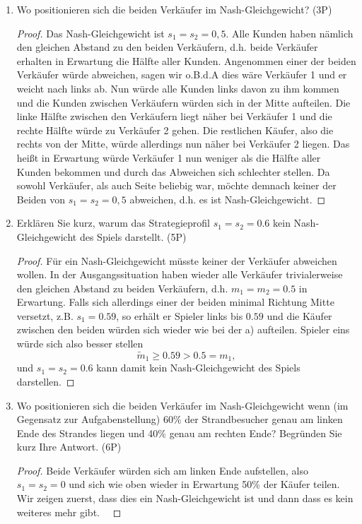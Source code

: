 \documentclass[12pt]{article}
\begin{document}
\begin{enumerate}[label=\alph*\upshape)]
	\item Wo positionieren sich die beiden Verkäufer im Nash-Gleichgewicht? (3P)
		\begin{proof}
			Das Nash-Gleichgewicht ist $s_1 = s_2 = 0,5$. Alle Kunden haben nämlich den gleichen Abstand zu den beiden Verkäufern, d.h. beide Verkäufer erhalten in Erwartung die Hälfte aller Kunden. Angenommen einer der beiden Verkäufer würde abweichen, sagen wir o.B.d.A dies wäre Verkäufer 1 und er weicht nach links ab. Nun würde alle Kunden links davon zu ihm kommen und die Kunden zwischen Verkäufern würden sich in der Mitte aufteilen. Die linke Hälfte zwischen den Verkäufern liegt näher bei Verkäufer 1 und die rechte Hälfte würde zu Verkäufer 2 gehen. Die restlichen Käufer, also die rechts von der Mitte, würde allerdings nun näher bei Verkäufer 2 liegen. Das heißt in Erwartung würde Verkäufer 1 nun weniger als die Hälfte aller Kunden bekommen und durch das Abweichen sich schlechter stellen. Da sowohl Verkäufer, als auch Seite beliebig war, möchte demnach keiner der Beiden von $s_1 = s_2 = 0,5$ abweichen, d.h. es ist Nash-Gleichgewicht.
		\end{proof}
	\item Erklären Sie kurz, warum das Strategieprofil $s_1 = s_2 = 0.6$ kein Nash-Gleichgewicht des Spiels darstellt. (5P)
		\begin{proof}
			Für ein Nash-Gleichgewicht müsste keiner der Verkäufer abweichen wollen. In der Ausgangssituation haben wieder alle Verkäufer trivialerweise den gleichen Abstand zu beiden Verkäufern, d.h. $m_1 = m_2 = 0.5$ in Erwartung. Falls sich allerdings einer der beiden minimal Richtung Mitte versetzt, z.B. $s_1 = 0.59$, so erhält er Spieler links bis $0.59$ und die Käufer zwischen den beiden würden sich wieder wie bei der a) aufteilen. Spieler eins würde sich also besser stellen 
			$$ \tilde{m}_1 \geq 0.59 > 0.5 = m_1, $$
			und $s_1 = s_2 = 0.6$ kann damit kein Nash-Gleichgewicht des Spiels darstellen.
		\end{proof}
	\item Wo positionieren sich die beiden Verkäufer im Nash-Gleichgewicht wenn (im Gegensatz zur Aufgabenstellung) 60\% der Strandbesucher genau am linken Ende des Strandes liegen und 40\% genau am rechten Ende? Begründen Sie kurz Ihre Antwort. (6P)
		\begin{proof}
			Beide Verkäufer würden sich am linken Ende aufstellen, also $s_1 = s_2 = 0$ und sich wie oben wieder in Erwartung 50\% der Käufer teilen. Wir zeigen zuerst, dass dies ein Nash-Gleichgewicht ist und dann dass es kein weiteres mehr gibt. ~\smallskip
			

\end{proof}
\end{enumerate}
\end{document}
